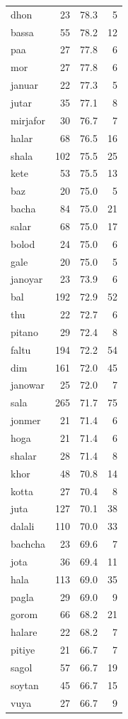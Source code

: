 \begin{tabular}{lrrr}
dhon & 23 & 78.3 & 5 \\
bassa & 55 & 78.2 & 12 \\
paa & 27 & 77.8 & 6 \\
mor & 27 & 77.8 & 6 \\
januar & 22 & 77.3 & 5 \\
jutar & 35 & 77.1 & 8 \\
mirjafor & 30 & 76.7 & 7 \\
halar & 68 & 76.5 & 16 \\
shala & 102 & 75.5 & 25 \\
kete & 53 & 75.5 & 13 \\
baz & 20 & 75.0 & 5 \\
bacha & 84 & 75.0 & 21 \\
salar & 68 & 75.0 & 17 \\
bolod & 24 & 75.0 & 6 \\
gale & 20 & 75.0 & 5 \\
janoyar & 23 & 73.9 & 6 \\
bal & 192 & 72.9 & 52 \\
thu & 22 & 72.7 & 6 \\
pitano & 29 & 72.4 & 8 \\
faltu & 194 & 72.2 & 54 \\
dim & 161 & 72.0 & 45 \\
janowar & 25 & 72.0 & 7 \\
sala & 265 & 71.7 & 75 \\
jonmer & 21 & 71.4 & 6 \\
hoga & 21 & 71.4 & 6 \\
shalar & 28 & 71.4 & 8 \\
khor & 48 & 70.8 & 14 \\
kotta & 27 & 70.4 & 8 \\
juta & 127 & 70.1 & 38 \\
dalali & 110 & 70.0 & 33 \\
bachcha & 23 & 69.6 & 7 \\
jota & 36 & 69.4 & 11 \\
hala & 113 & 69.0 & 35 \\
pagla & 29 & 69.0 & 9 \\
gorom & 66 & 68.2 & 21 \\
halare & 22 & 68.2 & 7 \\
pitiye & 21 & 66.7 & 7 \\
sagol & 57 & 66.7 & 19 \\
soytan & 45 & 66.7 & 15 \\
vuya & 27 & 66.7 & 9 \\

\end{tabular}
